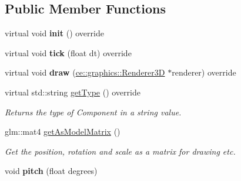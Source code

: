 \subsection*{Public Member Functions}
\begin{DoxyCompactItemize}
\item 
\mbox{\label{classce_1_1game_1_1_transform_component_a43c2bc090897e4581ebf0edf463d7c09}} 
virtual void {\bfseries init} () override
\item 
\mbox{\label{classce_1_1game_1_1_transform_component_afb2efbc69b503a59ebe4e0e6c8fc1b62}} 
virtual void {\bfseries tick} (float dt) override
\item 
\mbox{\label{classce_1_1game_1_1_transform_component_ad73ce4088d1771b2e28b8ce4f0ed9214}} 
virtual void {\bfseries draw} (\hyperlink{classce_1_1graphics_1_1_renderer3_d}{ce\+::graphics\+::\+Renderer3D} $\ast$renderer) override
\item 
virtual std\+::string \hyperlink{classce_1_1game_1_1_transform_component_ae4a2729b3f88a77b8405de317ab03510}{get\+Type} () override
\begin{DoxyCompactList}\small\item\em Returns the type of Component in a string value. \end{DoxyCompactList}\item 
\mbox{\label{classce_1_1game_1_1_transform_component_aa5460c96774e9b00ec4bfadadb1ec1ce}} 
glm\+::mat4 \hyperlink{classce_1_1game_1_1_transform_component_aa5460c96774e9b00ec4bfadadb1ec1ce}{get\+As\+Model\+Matrix} ()
\begin{DoxyCompactList}\small\item\em Get the position, rotation and scale as a matrix for drawing etc. \end{DoxyCompactList}\item 
\mbox{\label{classce_1_1game_1_1_transform_component_ad7b1abf547a1b3a592814c70d2b60523}} 
void {\bfseries pitch} (float degrees)
\item 
\mbox{\label{classce_1_1game_1_1_transform_component_afac531098bba8a0a4ea0130b7285dcdc}} 

\end{DoxyCompactItemize}
